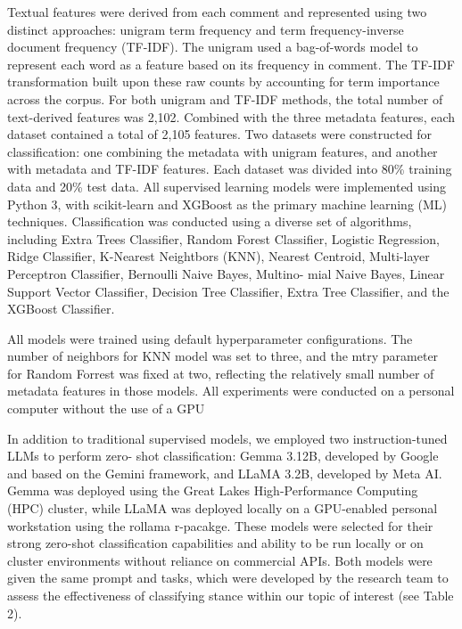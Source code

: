 \documentclass[
  12pt]{article}
\begin{document}
Textual features were derived from each comment and represented using
two distinct approaches: unigram term frequency and term
frequency-inverse document frequency (TF-IDF). The unigram used a
bag-of-words model to represent each word as a feature based on its
frequency in comment. The TF-IDF transformation built upon these raw
counts by accounting for term importance across the corpus. For both
unigram and TF-IDF methods, the total number of text-derived features
was 2,102. Combined with the three metadata features, each dataset
contained a total of 2,105 features. Two datasets were constructed for
classification: one combining the metadata with unigram features, and
another with metadata and TF-IDF features. Each dataset was divided into
80\% training data and 20\% test data. All supervised learning models
were implemented using Python 3, with scikit-learn and XGBoost as the
primary machine learning (ML) techniques. Classification was conducted
using a diverse set of algorithms, including Extra Trees Classifier,
Random Forest Classifier, Logistic Regression, Ridge Classifier,
K-Nearest Neightbors (KNN), Nearest Centroid, Multi-layer Perceptron
Classifier, Bernoulli Naive Bayes, Multino- mial Naive Bayes, Linear
Support Vector Classifier, Decision Tree Classifier, Extra Tree
Classifier, and the XGBoost Classifier.

All models were trained using default hyperparameter configurations. The
number of neighbors for KNN model was set to three, and the mtry
parameter for Random Forrest was fixed at two, reflecting the relatively
small number of metadata features in those models. All experiments were
conducted on a personal computer without the use of a GPU

In addition to traditional supervised models, we employed two
instruction-tuned LLMs to perform zero- shot classification: Gemma
3.12B, developed by Google and based on the Gemini framework, and LLaMA
3.2B, developed by Meta AI. Gemma was deployed using the Great Lakes
High-Performance Computing (HPC) cluster, while LLaMA was deployed
locally on a GPU-enabled personal workstation using the rollama
r-pacakge. These models were selected for their strong zero-shot
classification capabilities and ability to be run locally or on cluster
environments without reliance on commercial APIs. Both models were given
the same prompt and tasks, which were developed by the research team to
assess the effectiveness of classifying stance within our topic of
interest (see Table 2).

\hfill\break
\end{document}
